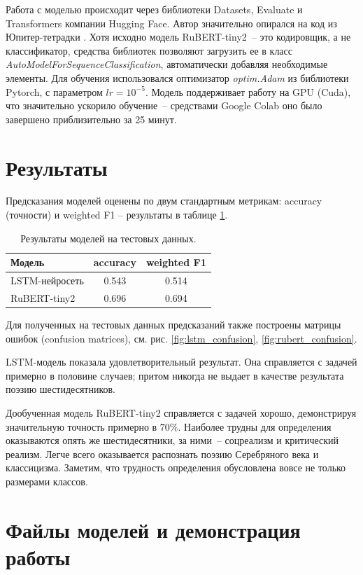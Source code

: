 \documentclass[a4paper,12pt]{article}
\begin{document}
Работа с моделью происходит через библиотеки Datasets, Evaluate и Transformers компании Hugging Face. Автор значительно опирался на код из Юпитер-тетрадки \cite{rubert_notebook}. Хотя исходно модель RuBERT-tiny2~-- это кодировщик, а не классификатор, средства библиотек позволяют загрузить ее в класс \textit{AutoModelForSequenceClassification}, автоматически добавляя необходимые элементы. Для обучения использовался оптимизатор \textit{optim.Adam} из библиотеки Pytorch, с параметром $lr = 10^{-5}$. Модель поддерживает работу на GPU (Cuda), что значительно ускорило обучение~-- средствами Google Colab оно было завершено приблизительно за 25 минут.


\section{Результаты}

Предсказания моделей оценены по двум стандартным метрикам: accuracy (точности) и weighted F1 -- результаты в таблице \ref{tab:results}.

\begin{table}[t]
\centering
\begin{tabular}[t]{|l|c|c|}
    \hline
    Модель & accuracy & weighted F1 \\
    \hline
    LSTM-нейросеть & 0.543 & 0.514 \\
    RuBERT-tiny2 & 0.696 & 0.694 \\
    \hline
\end{tabular}
\caption{Результаты моделей на тестовых данных.}
\label{tab:results}
\end{table}

Для полученных на тестовых данных предсказаний также построены матрицы ошибок (confusion matrices), см. рис. \ref{fig:lstm_confusion}, \ref{fig:rubert_confusion}.

LSTM-модель показала удовлетворительный результат. Она справляется с задачей примерно в половине случаев; притом никогда не выдает в качестве результата поэзию шестидесятников.

Дообученная модель RuBERT-tiny2 справляется с задачей хорошо, демонстрируя значительную точность примерно в $70 \%$. Наиболее трудны для определения оказываются опять же шестидесятники, за ними~-- соцреализм и критический реализм. Легче всего оказывается распознать поэзию Серебряного века и классицизма. Заметим, что трудность определения обусловлена вовсе не только размерами классов.


\section{Файлы моделей и демонстрация работы}
\end{document}
